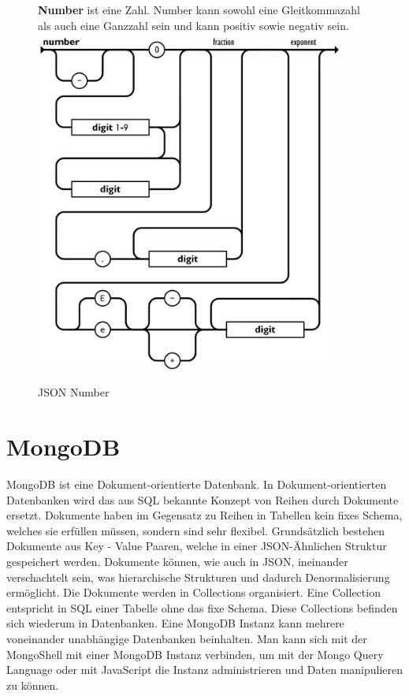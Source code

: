\begin{figure}[H]
    \begin{minipage}[t]{0.45\textwidth}
        \textbf{Number} ist eine Zahl.
        Number kann sowohl eine Gleitkommazahl als auch eine Ganzzahl sein und kann positiv sowie negativ sein.
        \includegraphics[width=0.9\textwidth]{images/json_number}
        \caption{JSON Number}
        \label{fig:json_number}
    \end{minipage}\hfill
\end{figure}

\section{MongoDB}
\label{sec:mongodb}

MongoDB ist eine Dokument-orientierte Datenbank. 
In Dokument-orientierten Datenbanken wird das aus SQL bekannte Konzept von Reihen durch Dokumente ersetzt.
Dokumente haben im Gegensatz zu Reihen in Tabellen kein fixes Schema, welches sie erfüllen müssen, sondern sind sehr flexibel.
Grundsätzlich bestehen Dokumente aus Key - Value Paaren, welche in einer JSON-Ähnlichen Struktur gespeichert werden.
Dokumente können, wie auch in JSON, ineinander verschachtelt sein, was hierarchische Strukturen und dadurch Denormalisierung ermöglicht.
Die Dokumente werden in Collections organisiert.
Eine Collection entspricht in SQL einer Tabelle ohne das fixe Schema.
Diese Collections befinden sich wiederum in Datenbanken.
Eine MongoDB Instanz kann mehrere voneinander unabhängige Datenbanken beinhalten.
Man kann sich mit der MongoShell mit einer MongoDB Instanz verbinden, um mit der Mongo Query Language oder mit JavaScript die Instanz administrieren und Daten manipulieren zu können.
~\autocite{bradshaw:mongodb}

